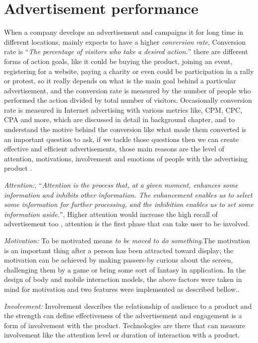 \section{Advertisement performance}
When a company develops an advertisement and campaigns it for long time in different locations, mainly expects to have a higher \emph{conversion rate}, Conversion rate is ``\emph{The percentage of visitors who take a desired action.}''\cite{convrate} there are different forms of action goals, like it could be buying the product, joining an event, registering for a website, paying a charity or even could be participation in a rally or protest, so it really depends on what is the main goal behind a particular advertisement, and the conversion rate is measured by the number of people who performed the action divided by total number of visitors. Occasionally conversion rate is measured in Internet advertising with various metrics like, CPM, CPC, CPA and more, which are discussed in detail in background chapter, and to understand the motive behind the conversion like what made them converted is an important question to ask, if we tackle those questions then we can create effective and efficient advertisements, those main reasons are the level of attention, motivations, involvement and emotions of people with the advertising product \cite{pervasiv_ad}.

\emph{Attention:}, ``\emph{Attention is the process that, at a given moment, enhances some information and inhibits other information. The enhancement enables us to select some information for further processing, and the inhibition enables us to set some information aside.}''\cite{Attention}, Higher attention would increase the high recall of advertisement too \cite{add_effectivenss}, attention is the first phase that can take user to be involved.

\emph{Motivation:}
To be motivated means \emph{to be moved to do something}\cite{motiv}.The motivation is an important thing after a person has been attracted toward display; the motivation can be achieved by making passers-by curious about the screen, challenging them by a game or bring some sort of fantasy in application. In the design of body and mobile interaction models, the above factors were taken in mind for motivation and two features were implemented as described bellow.\cite{toward_motivation}. 

\emph{Involvement:} Involvement describes the relationship of audience to a product and the strength can define effectiveness of the advertisement and engagement is a form of involvement with the product. Technologies are there that can measure involvement like the attention level or duration of interaction with a product.

